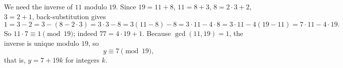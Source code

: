 We need the inverse of $11$ modulo $19$. Since $19=11+8$, $11=8+3$, $8=2\cdot3+2$, $3=2+1$, back-substitution gives
\[1=3-2=3-(8-2\cdot3)=3\cdot3-8=3(11-8)-8=3\cdot11-4\cdot8=3\cdot11-4(19-11)=7\cdot11-4\cdot19 .\]
So $11\cdot7\equiv1\pmod{19}$; indeed $77=4\cdot19+1$. Because $\gcd(11,19)=1$, the inverse is unique modulo $19$, so
\[\boxed{y\equiv7\pmod{19}},\]
that is, $y=7+19k$ for integers $k$.
